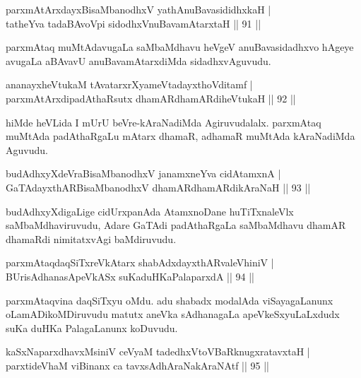 \begin{shl}
parxmAtArxdayxBisaMbanodhxV yathA\s nuBavasididhxkaH |\\
tatheYva tadaBAvoV\s pi sidodhxV\s nuBavamAtarxtaH \hfill || 91 ||
\end{shl}

\begin{artha}%
parxmAtaq muMtAdavugaLa saMbaMdhavu heVgeV anuBavasidadhxvo hAgeye avugaLa aBAvavU anuBavamAtarxdiMda sidadhxvAguvudu.
\end{artha}

\begin{shl}
ananayxheVtukaM tAvatarxrXyameVtadayxthoVditamf |\\
parxmAtArxdipadAthaRsutx dhamARdhamARdiheVtukaH \hfill || 92 ||
\end{shl}

\begin{artha}
hiMde heVLida I mUrU beVre-kAraNadiMda Agiruvudalalx. parxmAtaq muMtAda padAthaRgaLu mAtarx dhamaR, adhamaR muMtAda kAraNadiMda Aguvudu.
\end{artha}

\begin{shl}
budAdhxyXdeVraBisaMbanodhxV janamxneYva cidAtamxnA |\\
GaTAdayxthARBisaMbanodhxV dhamARdhamARdikAraNaH \hfill || 93 ||
\end{shl}

\begin{artha}
budAdhxyXdigaLige cidUrxpanAda AtamxnoDane huTiTxnaleVlx saMbaMdhaviruvudu, Adare GaTAdi padAthaRgaLa saMbaMdhavu dhamAR dhamaRdi nimitatxvAgi baMdiruvudu.
\end{artha}


\begin{shl}
parxmAtaqdaqSiTxreVkA\s tarx shabAdxdayxthARvaleVhiniV |\\
BUrisAdhanasApeVkASx suKaduHKaPalaparxdA \hfill || 94 ||
\end{shl}

\begin{artha}
parxmAtaqvina daqSiTxyu oMdu. adu shabadx modalAda viSayagaLanunx oLamADikoMDiruvudu matutx aneVka sAdhanagaLa apeVkeSxyuLaLxdudx suKa duHKa PalagaLanunx koDuvudu.
\end{artha}

\begin{shl}
kaSxNaparxdhavxMsiniV ceVyaM tadedhxVtoVBaRknugxratavxtaH |\\
parxtideVhaM viBinanx ca tavxsAdhAraNakAraNAtf \hfill || 95 ||
\end{shl}

